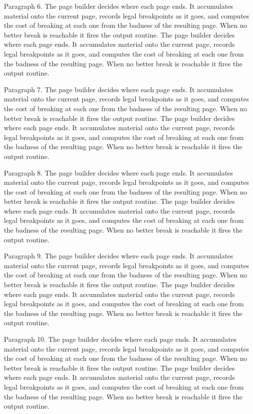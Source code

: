 Paragraph 6. The page builder decides where each page ends. It accumulates material onto the current page, records legal breakpoints as it goes, and computes the cost of breaking at each one from the badness of the resulting page. When no better break is reachable it fires the output routine. The page builder decides where each page ends. It accumulates material onto the current page, records legal breakpoints as it goes, and computes the cost of breaking at each one from the badness of the resulting page. When no better break is reachable it fires the output routine. 

Paragraph 7. The page builder decides where each page ends. It accumulates material onto the current page, records legal breakpoints as it goes, and computes the cost of breaking at each one from the badness of the resulting page. When no better break is reachable it fires the output routine. The page builder decides where each page ends. It accumulates material onto the current page, records legal breakpoints as it goes, and computes the cost of breaking at each one from the badness of the resulting page. When no better break is reachable it fires the output routine. 

Paragraph 8. The page builder decides where each page ends. It accumulates material onto the current page, records legal breakpoints as it goes, and computes the cost of breaking at each one from the badness of the resulting page. When no better break is reachable it fires the output routine. The page builder decides where each page ends. It accumulates material onto the current page, records legal breakpoints as it goes, and computes the cost of breaking at each one from the badness of the resulting page. When no better break is reachable it fires the output routine. 

Paragraph 9. The page builder decides where each page ends. It accumulates material onto the current page, records legal breakpoints as it goes, and computes the cost of breaking at each one from the badness of the resulting page. When no better break is reachable it fires the output routine. The page builder decides where each page ends. It accumulates material onto the current page, records legal breakpoints as it goes, and computes the cost of breaking at each one from the badness of the resulting page. When no better break is reachable it fires the output routine. 

Paragraph 10. The page builder decides where each page ends. It accumulates material onto the current page, records legal breakpoints as it goes, and computes the cost of breaking at each one from the badness of the resulting page. When no better break is reachable it fires the output routine. The page builder decides where each page ends. It accumulates material onto the current page, records legal breakpoints as it goes, and computes the cost of breaking at each one from the badness of the resulting page. When no better break is reachable it fires the output routine. 


